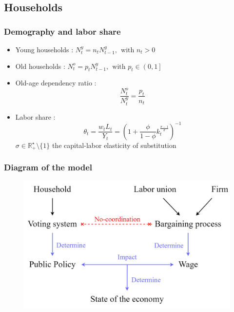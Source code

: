 \documentclass{beamer}
\begin{document}
		\subsection{Households}
			\begin{frame}\frametitle{Demography and labor share}
				\begin{itemize}
					\item Young households : $N_t^y = n_t N_{t-1}^y, ~~ \text{with } n_t>0$
					\item Old households : $N_t^o = p_t N_{t-1}^y, ~~ \text{with } p_t\in \left(0,1\right]$
					\vspace{1em}
					\item Old-age dependency ratio :
					\begin{equation*}
						\frac{N_t^o}{N_t^y} = \frac{p_t}{n_t}
					\end{equation*}
					\item Labor share :
					\begin{equation*}
					\theta_t = \frac{w_t L_t}{Y_t}=  \left(1+\frac{\phi}{1-\phi}k_t^{\frac{\sigma-1}{\sigma}}\right)^{-1}
					\end{equation*}
					$\sigma \in \mathbb{R}^\star_+\setminus\lbrace 1 \rbrace$ the capital-labor elasticity of substitution
				\end{itemize}
			\end{frame}
		\begin{frame}\frametitle{Diagram of the model}
			\begin{figure}[ht]
				\centering
				\includegraphics[width=\linewidth]{Diagrams/model_diagram.png}
			\end{figure}
		\end{frame}
\end{document}
